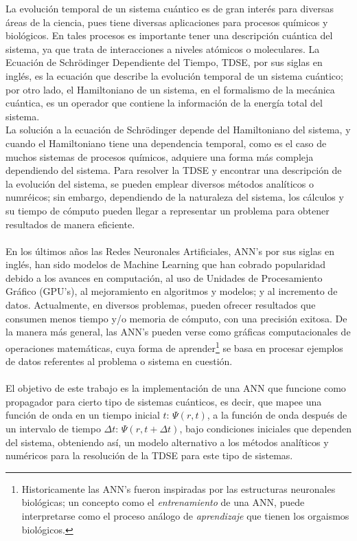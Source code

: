 La evolución temporal de un sistema cuántico es de gran interés para diversas áreas de la ciencia, pues tiene diversas aplicaciones para procesos químicos y biológicos. En tales procesos es importante tener una descripción cuántica del sistema, ya que trata de interacciones a niveles atómicos o moleculares. La Ecuación de Schrödinger Dependiente del Tiempo, TDSE, por sus siglas en inglés, es la ecuación que describe la evolución temporal de un sistema cuántico; por otro lado, el Hamiltoniano de un sistema, en el formalismo de la mecánica cuántica, es un operador que contiene la información de la energía total del sistema.
\\
La solución a la ecuación de Schrödinger depende del Hamiltoniano del sistema, y cuando el Hamiltoniano tiene una dependencia temporal, como es el caso de muchos sistemas de procesos químicos, adquiere una forma más compleja dependiendo del sistema. Para resolver la TDSE y encontrar una descripción de la evolución del sistema, se pueden emplear diversos métodos analíticos o numréicos; sin embargo, dependiendo de la naturaleza del sistema, los cálculos y su tiempo de cómputo pueden llegar a representar un problema para obtener resultados de manera eficiente.
\\
\\
En los últimos años las Redes Neuronales Artificiales, ANN's por sus siglas en inglés, han sido modelos de Machine Learning que han cobrado popularidad debido a los avances en computación, al uso de Unidades de Procesamiento Gráfico (GPU's), al mejoramiento en algoritmos y modelos; y al incremento de datos. Actualmente, en diversos problemas, pueden ofrecer resultados que consumen menos tiempo y/o memoria de cómputo, con una precisión exitosa. De la manera más general, las ANN's pueden verse como gráficas computacionales de operaciones matemáticas, cuya forma de aprender\footnote{Historicamente las ANN's fueron inspiradas por las estructuras neuronales biológicas; un concepto como el \emph{entrenamiento} de una ANN, puede interpretarse como el proceso análogo de \emph{aprendizaje} que tienen los orgaismos biológicos.} se basa en procesar ejemplos de datos referentes al problema o sistema en cuestión.
\\
\\
El objetivo de este trabajo es la implementación de una ANN que funcione como propagador para cierto tipo de sistemas cuánticos, es decir, que mapee una función de onda en un tiempo inicial $t$: $\Psi(r,t)$, a la función de onda después de un intervalo de tiempo $\Delta t$: $\Psi(r,t+\Delta t)$, bajo condiciones iniciales que dependen del sistema, obteniendo así, un modelo alternativo a los métodos analíticos y numéricos para la resolución de la TDSE para este tipo de sistemas.

